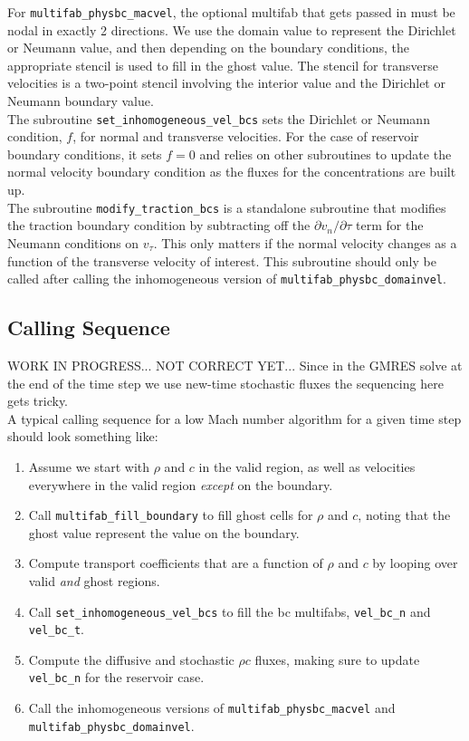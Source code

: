 \documentclass[final]{siamltex}
\begin{document}
For {\tt multifab\_physbc\_macvel}, the optional multifab that gets passed in
must be nodal in exactly 2 directions.
We use the domain value to represent
the Dirichlet or Neumann value, and then depending on the boundary conditions, the 
appropriate stencil is used to fill in the ghost value.
The stencil for transverse velocities is a two-point stencil involving the
interior value and the Dirichlet or Neumann boundary value.\\

The subroutine {\tt set\_inhomogeneous\_vel\_bcs} sets the Dirichlet or
Neumann condition, $f$, for normal and transverse velocities.  For the case of 
reservoir boundary conditions, it sets $f=0$ and relies on other subroutines 
to update the normal velocity boundary condition as the fluxes for the concentrations
are built up.\\

The subroutine {\tt modify\_traction\_bcs} is a standalone subroutine that
modifies the traction boundary condition by subtracting off the 
$\partial v_n/\partial\tau$ term for the Neumann conditions
on $v_{\tau}$.  This only matters if the normal velocity
changes as a function of the transverse velocity of interest.  This subroutine
should only be called after calling the inhomogeneous version of 
{\tt multifab\_physbc\_domainvel}.

\subsection{Calling Sequence}
WORK IN PROGRESS... NOT CORRECT YET... Since in the GMRES solve at the end of the
time step we use new-time stochastic fluxes the sequencing here gets tricky.\\

A typical calling sequence for a low Mach number algorithm for a given time
step should look something like:
\begin{enumerate}
\item Assume we start with $\rho$ and $c$ in the valid region, as well as
velocities everywhere in the valid region {\it except} on the boundary.
\item Call {\tt multifab\_fill\_boundary} to fill ghost cells for $\rho$ and
$c$, noting that the ghost value represent the value on the boundary.
\item Compute transport coefficients that are a function of $\rho$ and $c$ by
looping over valid {\it and} ghost regions.
\item Call {\tt set\_inhomogeneous\_vel\_bcs} to fill the bc multifabs,
{\tt vel\_bc\_n} and {\tt vel\_bc\_t}.
\item Compute the diffusive and stochastic $\rho c$ fluxes, making sure to update
{\tt vel\_bc\_n} for the reservoir case.
\item Call the inhomogeneous versions of {\tt multifab\_physbc\_macvel} and
{\tt multifab\_physbc\_domainvel}.
\end{enumerate}
\end{document}
